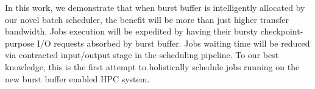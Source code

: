 In this work, we demonstrate that when burst buffer is intelligently allocated 
by our novel batch scheduler,
the benefit will be more than just higher transfer bandwidth.
Jobs execution will be expedited by having their bursty checkpoint-purpose I/O requests 
absorbed by burst buffer.
Jobs waiting time will be reduced via
contracted input/output stage in the scheduling pipeline.
To our best knowledge, this is the first attempt to holistically 
schedule jobs running on the new burst buffer enabled HPC system.







